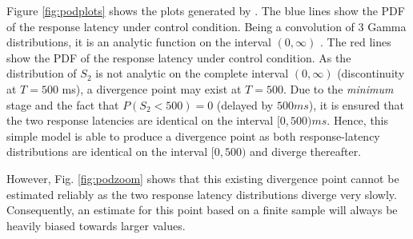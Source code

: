 Figure \ref{fig:podplots} shows the plots generated by . The blue lines show the PDF
of the response latency under control condition. Being a convolution of 3 Gamma distributions, it 
is an analytic function on the interval $(0,\infty)$ \citep{Gelooven1999}. The red lines show the 
PDF of the response latency under control condition. As the distribution of $S_2$ is not analytic on 
the complete interval $(0,\infty)$ (discontinuity at $T=500$ ms), a divergence point may exist at 
$T=500$. Due to the \emph{minimum} stage and the fact that $P(S_2<500)=0$ (delayed by 
$500 ms$), it is ensured that the two response latencies are identical on the interval $[0,500) ms$.
Hence, this simple model is able to produce a divergence point as both response-latency distributions are identical
on the interval $[0,500)$ and diverge thereafter.

However, Fig. \ref{fig:podzoom} shows that this existing divergence point cannot be estimated reliably as the two 
response latency distributions diverge very slowly. Consequently, an estimate for this point \cite[e.g. by means of 
estimators proposed in][]{Reingold2012} based on a finite sample will always be heavily biased towards larger
values.